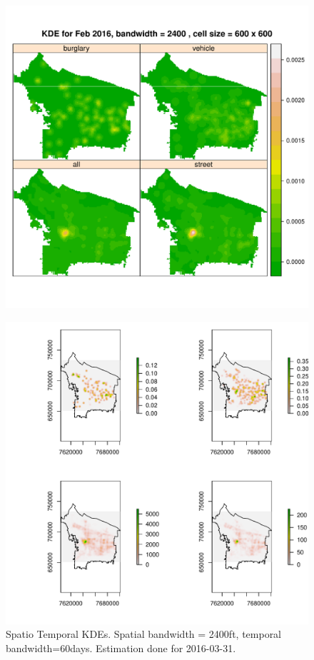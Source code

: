 \documentclass[12pt,letterpaper]{article}
\theoremstyle{plain}
\theoremstyle{plain}
\theoremstyle{definition}
\theoremstyle{remark}
\begin{document}
\begin{figure}[h!]
    \centering
    \includegraphics[]{figures/kde_bycategory.pdf}
    \caption{}
    \label{fig:figure1}
\end{figure}

\begin{figure}[h!]
    \centering
    \includegraphics[scale=1]{figures/kde3d.pdf}
    \caption{Spatio Temporal KDEs. Spatial bandwidth = 2400ft, temporal bandwidth=60days. Estimation done for 2016-03-31.}
    \label{fig:figure1}
\end{figure}
\end{document}
